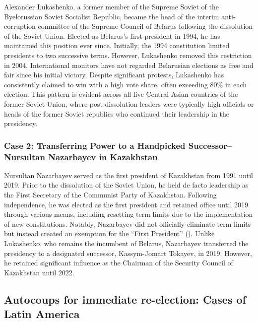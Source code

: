 \documentclass[
  12pt,
]{report}
\begin{document}
Alexander Lukashenko, a former member of the Supreme Soviet of the
Byelorussian Soviet Socialist Republic, became the head of the interim
anti-corruption committee of the Supreme Council of Belarus following
the dissolution of the Soviet Union. Elected as Belarus's first
president in 1994, he has maintained this position ever since.
Initially, the 1994 constitution limited presidents to two successive
terms. However, Lukashenko removed this restriction in 2004.
International monitors have not regarded Belarusian elections as free
and fair since his initial victory. Despite significant protests,
Lukashenko has consistently claimed to win with a high vote share, often
exceeding 80\% in each election. This pattern is evident across all five
Central Asian countries of the former Soviet Union, where
post-dissolution leaders were typically high officials or heads of the
former Soviet republics who continued their leadership in the
presidency.

\subsubsection*{Case 2: Transferring Power to a Handpicked
Successor--Nursultan Nazarbayev in
Kazakhstan}\label{case-2-transferring-power-to-a-handpicked-successornursultan-nazarbayev-in-kazakhstan}

Nursultan Nazarbayev served as the first president of Kazakhstan from
1991 until 2019. Prior to the dissolution of the Soviet Union, he held
de facto leadership as the First Secretary of the Communist Party of
Kazakhstan. Following independence, he was elected as the first
president and retained office until 2019 through various means,
including resetting term limits due to the implementation of new
constitutions. Notably, Nazarbayev did not officially eliminate term
limits but instead created an exemption for the ``First President''
(). Unlike
Lukashenko, who remains the incumbent of Belarus, Nazarbayev transferred
the presidency to a designated successor, Kassym-Jomart Tokayev, in
2019. However, he retained significant influence as the Chairman of the
Security Council of Kazakhstan until 2022.

\subsection{Autocoups for immediate re-election: Cases of Latin
America}\label{autocoups-for-immediate-re-election-cases-of-latin-america}
\end{document}
